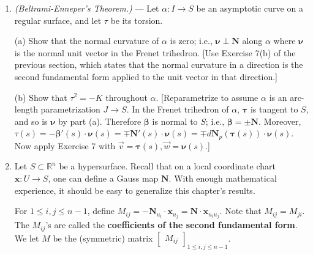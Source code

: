 \documentclass[leqno]{book}
\begin{document}
\begin{enumerate}
(c) If a vector $\vec v\in T_pS$ extends to meet the Dupin indicatrix $\Delta(p)$ at $q$, and $\ell$ is the tangent line to the Dupin indicatrix at $q$, then $\vec v$ is conjugate to any direction parallel to $\ell$.  This is a geometric derivation of conjugate directions from the Dupin indicatrix.  [Fix an orthonormal eigenbasis of $d\mathbf N_p$, find an algebraic formula for the Dupin indicatrix, and use multivariable calculus.]

\item\emph{(Beltrami-Enneper's Theorem.)} \---- Let $\alpha:I\to S$ be an asymptotic curve on a regular surface, and let $\tau$ be its torsion.

(a) Show that the normal curvature of $\alpha$ is zero; i.e., $\boldsymbol\nu\perp\mathbf N$ along $\alpha$ where $\boldsymbol\nu$ is the normal unit vector in the Frenet trihedron.  [Use Exercise 7(b) of the previous section, which states that the normal curvature in a direction is the second fundamental form applied to the unit vector in that direction.]

(b) Show that $\tau^2=-K$ throughout $\alpha$.  [Reparametrize to assume $\alpha$ is an arc-length parametrization $J\to S$.  In the Frenet trihedron of $\alpha$, $\boldsymbol\tau$ is tangent to $S$, and so is $\boldsymbol\nu$ by part (a).  Therefore $\boldsymbol\beta$ is normal to $S$; i.e., $\boldsymbol\beta=\pm\mathbf N$.  Moreover, $\tau(s)=-\boldsymbol\beta'(s)\cdot\boldsymbol\nu(s)=\mp\mathbf N'(s)\cdot\boldsymbol\nu(s)=\mp d\mathbf N_p(\boldsymbol\tau(s))\cdot\boldsymbol\nu(s)$.  Now apply Exercise 7 with $\vec v=\boldsymbol\tau(s),\vec w=\boldsymbol\nu(s)$.]

\item Let $S\subset\mathbb R^n$ be a hypersurface.  Recall that on a local coordinate chart $\mathbf x:U\to S$, one can define a Gauss map $\mathbf N$.  With enough mathematical experience, it should be easy to generalize this chapter's results.

For $1\leqslant i,j\leqslant n-1$, define $M_{ij}=-\mathbf N_{u_i}\cdot\mathbf x_{u_j}=\mathbf N\cdot\mathbf x_{u_iu_j}$.  Note that $M_{ij}=M_{ji}$.  The $M_{ij}$'s are called the \textbf{coefficients of the second fundamental form}.  We let $M$ be the (symmetric) matrix $\begin{bmatrix}M_{ij}\end{bmatrix}_{1\leqslant i,j\leqslant n-1}$.


\end{enumerate}
\end{document}
